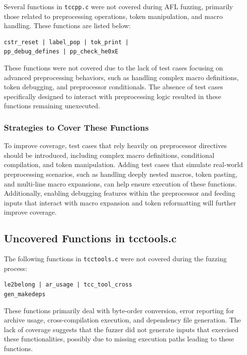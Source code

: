 \documentclass[conference]{IEEEtran}
\begin{document}
Several functions in \texttt{tccpp.c} were not covered during AFL fuzzing, primarily those related to preprocessing operations, token manipulation, and macro handling. These functions are listed below:

\begin{verbatim}
cstr_reset | label_pop | tok_print | 
pp_debug_defines | pp_check_he0xE
\end{verbatim}

These functions were not covered due to the lack of test cases focusing on advanced preprocessing behaviors, such as handling complex macro definitions, token debugging, and preprocessor conditionals. The absence of test cases specifically designed to interact with preprocessing logic resulted in these functions remaining unexecuted.

\subsubsection{Strategies to Cover These Functions}

To improve coverage, test cases that rely heavily on preprocessor directives should be introduced, including complex macro definitions, conditional compilation, and token manipulation. Adding test cases that simulate real-world preprocessing scenarios, such as handling deeply nested macros, token pasting, and multi-line macro expansions, can help ensure execution of these functions. Additionally, enabling debugging features within the preprocessor and feeding inputs that interact with macro expansion and token reformatting will further improve coverage.

\subsection{Uncovered Functions in tcctools.c}

The following functions in \texttt{tcctools.c} were not covered during the fuzzing process:

\begin{verbatim}
le2belong | ar_usage | tcc_tool_cross 
gen_makedeps
\end{verbatim}

These functions primarily deal with byte-order conversion, error reporting for archive usage, cross-compilation execution, and dependency file generation. The lack of coverage suggests that the fuzzer did not generate inputs that exercised these functionalities, possibly due to missing execution paths leading to these functions.
\end{document}
